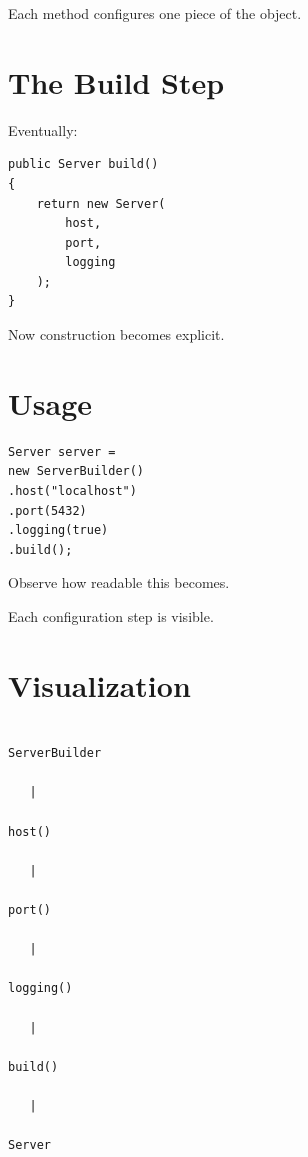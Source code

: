 \documentclass[11pt,a4paper]{book}
\begin{document}

Each method configures
one piece of the object.


\section{The Build Step}

Eventually:

\begin{verbatim}
public Server build()
{
    return new Server(
        host,
        port,
        logging
    );
}
\end{verbatim}


Now construction becomes
explicit.


\section{Usage}

\begin{verbatim}
Server server =
new ServerBuilder()
.host("localhost")
.port(5432)
.logging(true)
.build();
\end{verbatim}


Observe how readable
this becomes.


Each configuration step
is visible.


\section{Visualization}

\begin{verbatim}

ServerBuilder

   |

host()

   |

port()

   |

logging()

   |

build()

   |

Server

\end{verbatim}
\end{document}

